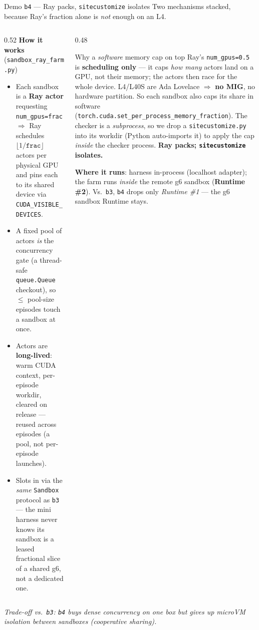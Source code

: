 \documentclass[aspectratio=169]{beamer}
\begin{document}
\begin{frame}{Demo \texttt{b4} --- Ray packs, \texttt{sitecustomize} isolates}
  \footnotesize Two mechanisms stacked, because Ray's fraction alone is \emph{not} enough on an L4.
  \begin{columns}[T]
    \begin{column}{0.52\textwidth}
      \textbf{How it works} (\texttt{sandbox\_ray\_farm.py})
      \begin{itemize}\setlength\itemsep{0.12em}
        \item Each sandbox is a \textbf{Ray actor} requesting \texttt{num\_gpus=frac} $\Rightarrow$
          Ray schedules $\lfloor 1/\texttt{frac}\rfloor$ actors per physical GPU and pins each to its
          shared device via \texttt{CUDA\_VISIBLE\_DEVICES}.
        \item A fixed pool of actors \emph{is} the concurrency gate (a thread-safe \texttt{queue.Queue}
          checkout), so $\le$ pool-size episodes touch a sandbox at once.
        \item Actors are \textbf{long-lived}: warm CUDA context, per-episode workdir, cleared on
          release --- reused across episodes (a pool, not per-episode launches).
        \item Slots in via the \emph{same} \texttt{Sandbox} protocol as \texttt{b3} --- the mini harness
          never knows its sandbox is a leased fractional slice of a shared g6, not a dedicated one.
      \end{itemize}
    \end{column}
    \begin{column}{0.48\textwidth}
      \begin{block}{Why a \emph{software} memory cap on top}
        \scriptsize Ray's \texttt{num\_gpus=0.5} is \textbf{scheduling only} --- it caps \emph{how many}
        actors land on a GPU, not their memory; the actors then race for the whole device. L4/L40S are
        Ada Lovelace $\Rightarrow$ \textbf{no MIG}, no hardware partition. So each sandbox also caps its
        share in software (\texttt{torch.cuda.set\_per\_process\_memory\_fraction}). The checker is a
        \emph{subprocess}, so we drop a \texttt{sitecustomize.py} into its workdir (Python auto-imports
        it) to apply the cap \emph{inside} the checker process. \textbf{Ray packs; \texttt{sitecustomize}
        isolates.}
      \end{block}
      \vspace{0.2em}
      {\scriptsize \textbf{Where it runs}: harness in-process (localhost adapter); the farm runs
      \emph{inside} the remote g6 sandbox (\textbf{Runtime \#2}). Vs.\ \texttt{b3}, \texttt{b4} drops
      only \emph{Runtime \#1} --- the g6 sandbox Runtime stays.}
    \end{column}
  \end{columns}
  \vspace{0.2em}
  {\footnotesize\itshape Trade-off vs.\ \texttt{b3}: \texttt{b4} buys dense concurrency on one box but
  gives up microVM isolation between sandboxes (cooperative sharing).}
\end{frame}
\end{document}
